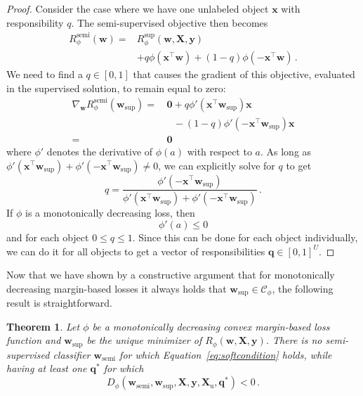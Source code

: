 \documentclass[twoside]{memoir}\usepackage[]{graphicx}\usepackage{xcolor}
\newtheorem{theorem}{Theorem}
\begin{document}
\begin{proof}
Consider the case where we have one unlabeled object $\mathbf{x}$ with responsibility $q$. The semi-supervised objective then becomes
\begin{align}
{R}^\mathrm{semi}_\phi (\mathbf{w})  = & {R}^\mathrm{sup}_\phi(\mathbf{w},\mathbf{X},\mathbf{y}) \nonumber \\
& + q \phi(\mathbf{x}^\top \mathbf{w}) + (1-q) \phi(-\mathbf{x}^\top \mathbf{w}) \, . \nonumber
\end{align}
We need to find a $q \in [0,1]$ that causes the gradient of this objective, evaluated in the supervised solution, to remain equal to zero:
\begin{equation}\label{eq:qequality}
\begin{split}
\nabla_{\mathbf{w}}  {R}_\phi^\mathrm{semi}({\mathbf{w}_\mathrm{sup}}) = &\,  \mathbf{0} + q \phi'(\mathbf{x}^\top \mathbf{w}_\mathrm{sup}) \mathbf{x} \\
& \,\,\,\,\, - (1-q) \phi'(-\mathbf{x}^\top \mathbf{w}_\mathrm{sup}) \mathbf{x}  \\
= & \,  \mathbf{0}
\end{split}
\end{equation}
where $\phi'$ denotes the derivative of $\phi(a)$ with respect to $a$. As long as $\phi'(\mathbf{x}^\top \mathbf{w}_\mathrm{sup}) + \phi'(-\mathbf{x}^\top \mathbf{w}_\mathrm{sup}) \neq 0$, we can explicitly solve for $q$ to get
\begin{equation}
q = \frac{\phi'(-\mathbf{x}^\top \mathbf{w}_\mathrm{sup})}{\phi'(\mathbf{x}^\top \mathbf{w}_\mathrm{sup}) + \phi'(-\mathbf{x}^\top \mathbf{w}_\mathrm{sup})} \,.
\end{equation}
If $\phi$ is a monotonically decreasing loss, then
$$ \phi'(a) \leq 0 $$
and for each object $0 \leq q\leq 1$. Since this can be done for each object individually, we can do it for all objects to get a vector of responsibilities $\mathbf{q} \in [0,1]^U$.
\end{proof}

Now that we have shown by a constructive argument that for monotonically decreasing margin-based losses it always holds that  $\mathbf{w}_\mathrm{sup} \in \mathcal{C}_\phi$, the following result is straightforward.
\begin{theorem} \label{theorem:softlabels}
Let $\phi$ be a monotonically decreasing convex margin-based loss function and $\mathbf{w}_\mathrm{sup}$ be the unique minimizer of $ {R}_\phi(\mathbf{w},\mathbf{X},\mathbf{y})$. There is no semi-supervised classifier $\mathbf{w}_\mathrm{semi}$ for which Equation~\eqref{eq:softcondition} holds, while having at least one $\mathbf{q}^\ast$ for which $$ {D}_\phi(\mathbf{w}_\mathrm{semi},\mathbf{w}_\mathrm{sup},\mathbf{X},\mathbf{y},\mathbf{X}_\mathrm{u},\mathbf{q}^\ast) < 0\,.$$
\end{theorem}
\end{document}

